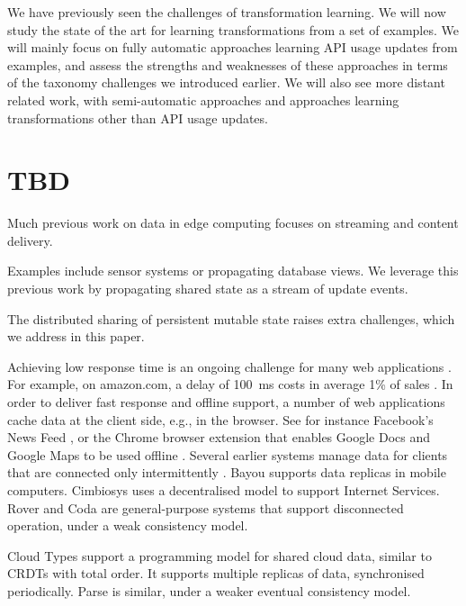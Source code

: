 
We have previously seen the challenges of transformation learning.
We will now study the state of the art for learning transformations from
a set of examples.
We will mainly focus on fully automatic approaches learning API usage updates
from examples, and assess the strengths and weaknesses of these approaches
in terms of the taxonomy challenges we introduced earlier.
We will also see more distant related work, with semi-automatic approaches
and approaches learning transformations other than API usage updates.


\section{TBD}

Much previous work on data in edge computing 
\cite{app:rep:1826, syn:optim:rep:1433, rep:1844}
focuses on streaming and content delivery.

Examples include sensor systems or propagating database views.
We leverage this previous work by propagating shared state as a
stream of update events.

The distributed sharing of persistent mutable state raises extra
challenges, which we address in this paper.

Achieving low response time is an ongoing challenge for many web applications
\cite{akamai:2010:press, kohavi2007online, leighton2009improving}.
For example, on amazon.com, a delay of 100 ms costs in average 1\% of
sales \cite{kohavi2007online}.
In order to deliver fast response and offline support, a number of web
applications cache data at the client side, e.g., in the browser.
See for instance Facebook's News Feed \cite{facebook:newsfeed}, or the
Chrome browser extension that enables Google Docs and Google Maps to be
used offline \cite{googledocs:offline}.
Several earlier systems manage data for clients that are connected only
intermittently \cite{optim:rep:syn:1500,rep:syn:app:1728}.
Bayou \cite{syn:optim:rep:1433} supports data replicas in
mobile computers.
Cimbiosys \cite{app:rep:1826} uses a decentralised model to support
Internet Services.
Rover \cite{rep:1844} and Coda \cite{fic:rep:887} are general-purpose
systems that support disconnected operation, under a weak consistency
model.


Cloud Types \cite{syn:app:1761} support a programming
model for shared cloud data, similar to CRDTs with total order.
It supports multiple replicas of data, synchronised periodically.
Parse \cite{syn:app:1761} is similar, under a weaker eventual consistency
model.

